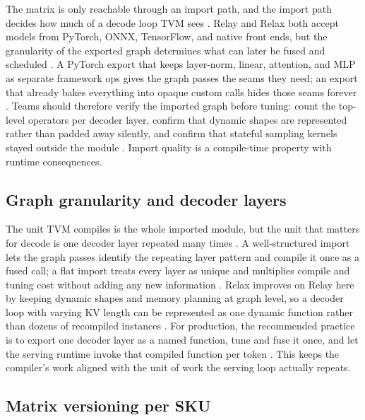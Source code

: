 The matrix is only reachable through an import path, and the import path decides how much of a decode loop TVM sees \citep{chen2018tvm,lai2023relax}. Relay and Relax both accept models from PyTorch, ONNX, TensorFlow, and native front ends, but the granularity of the exported graph determines what can later be fused and scheduled \citep{chen2018tvm,lai2023relax}. A PyTorch export that keeps layer-norm, linear, attention, and MLP as separate framework ops gives the graph passes the seams they need; an export that already bakes everything into opaque custom calls hides those seams forever \citep{patel2025llminference,chen2020compilerbasedhardw}. Teams should therefore verify the imported graph before tuning: count the top-level operators per decoder layer, confirm that dynamic shapes are represented rather than padded away silently, and confirm that stateful sampling kernels stayed outside the module \citep{kwon2023vllm,taxbreak2026}. Import quality is a compile-time property with runtime consequences.

\subsection{Graph granularity and decoder layers}

The unit TVM compiles is the whole imported module, but the unit that matters for decode is one decoder layer repeated many times \citep{dao2022flashattention,taxbreak2026}. A well-structured import lets the graph passes identify the repeating layer pattern and compile it once as a fused call; a flat import treats every layer as unique and multiplies compile and tuning cost without adding any new information \citep{chen2018tvm,patel2025llminference}. Relax improves on Relay here by keeping dynamic shapes and memory planning at graph level, so a decoder loop with varying KV length can be represented as one dynamic function rather than dozens of recompiled instances \citep{lai2023relax,kwon2023vllm}. For production, the recommended practice is to export one decoder layer as a named function, tune and fuse it once, and let the serving runtime invoke that compiled function per token \citep{patel2025llminference,memoryfloor2026}. This keeps the compiler's work aligned with the unit of work the serving loop actually repeats.

\subsection{Matrix versioning per SKU}


